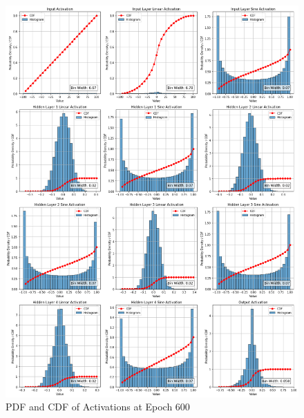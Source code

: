 \documentclass{ioereport}
\begin{document}
    \begin{figure}[H]
        \centering
        \includegraphics[width=\linewidth]{assets/audio histogram/epoch600activations.png}
        \caption{PDF and CDF of Activations at Epoch 600}
        \label{fig:audio-activation-600}
    \end{figure}
\end{document}
